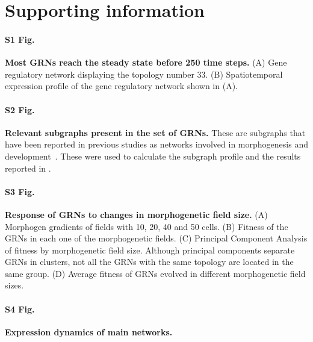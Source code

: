 \documentclass[10pt,letterpaper]{article}
\begin{document}


\section*{Supporting information}


\paragraph*{S1 Fig.}
\label{S1_Fig}
{\bf Most GRNs reach the steady state before 250 time steps.}
(A) Gene regulatory network displaying the topology number 33. (B) Spatiotemporal
expression profile of the gene regulatory network shown in (A).

\paragraph*{S2 Fig.}
\label{S2_Fig}
{\bf Relevant subgraphs present in the set of GRNs.}
These are subgraphs that have been reported in previous studies as networks
involved in morphogenesis and development~\cite{Cotterell2010, Schaerli2014,
Schaerli2018}. These were used to calculate the subgraph profile and the results
reported in .

\paragraph*{S3 Fig.}
\label{S3_Fig}
{\bf Response of GRNs to changes in morphogenetic field size.}
(A) Morphogen gradients of fields with 10, 20, 40 and 50 cells. (B) Fitness of the
GRNs in each one of the morphogenetic fields. (C) Principal Component Analysis
of fitness by morphogenetic field size. Although principal components separate
GRNs in clusters, not all the GRNs with the same topology are located in the
same group. (D) Average fitness of GRNs evolved in different morphogenetic
field sizes.

\paragraph*{S4 Fig.}
\label{S4_Fig}
{\bf Expression dynamics of main networks.}
\end{document}
